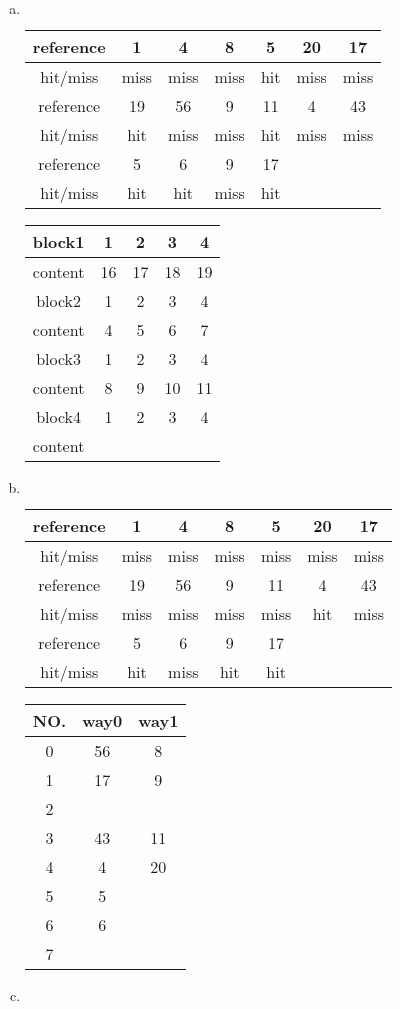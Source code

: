 \documentclass[12pt]{article}
\begin{document}
\begin{CJK*}{UTF8}{gbsn}
\begin{enumerate}[a)]
\newpage
\item
$ $\\

\begin{tabular}{|c|c|c|c|c|c|c|}
\hline 
reference	& 1 		& 4 		& 8 		&5& 20 	& 17 	 \\ 
\hline 
hit/miss		& miss 	& miss 	& miss 	&hit& miss 	& miss 	 \\ 
\hline 
reference &19& 56 & 9 & 11 & 4 & 43  \\ 
\hline 
hit/miss &hit& miss & miss & hit & miss & miss  \\ 
\hline
reference &5& 6 & 9 & 17 &&\\
\hline
hit/miss &hit& hit & miss &hit&&\\
\hline 
\end{tabular} 

\begin{tabular}{|c|c|c|c|c|}
\hline 
block1 & 1 & 2 & 3 & 4 \\ 
\hline 
content & 16 & 17 & 18 & 19 \\ 
\hline 
block2 & 1 & 2 & 3 & 4 \\ 
\hline 
content & 4 & 5 & 6 & 7 \\ 
\hline 
block3 & 1 & 2 & 3 & 4 \\ 
\hline 
content & 8 & 9 & 10 & 11 \\ 
\hline 
block4 & 1 & 2 & 3 & 4 \\ 
\hline 
content &  &  &  &  \\ 
\hline 
\end{tabular} 

\item
$ $\\
\begin{tabular}{|c|c|c|c|c|c|c|}
\hline 
reference	& 1 		& 4 		& 8 		&5& 20 	& 17 	 \\ 
\hline 
hit/miss		& miss 	& miss 	& miss 	&miss& miss 	& miss 	 \\ 
\hline 
reference &19& 56 & 9 & 11 & 4 & 43  \\ 
\hline 
hit/miss &miss& miss & miss & miss & hit & miss  \\ 
\hline
reference &5& 6 & 9 & 17 &&\\
\hline
hit/miss &hit& miss & hit &hit&&\\
\hline 
\end{tabular} 

\begin{tabular}{|c|c|c|}
\hline
NO. & way0 & way1\\
\hline
0 & 56 & 8  \\
\hline
1 & 17 & 9  \\
\hline
2 &  &   \\
\hline
3 & 43 & 11  \\
\hline
4 & 4 & 20  \\
\hline
5 & 5 &   \\
\hline
6 & 6 &   \\
\hline
7 &  &   \\
\hline
\end{tabular}
\newpage
\item
$ $\\


\end{enumerate}
\end{CJK*}
\end{document}
